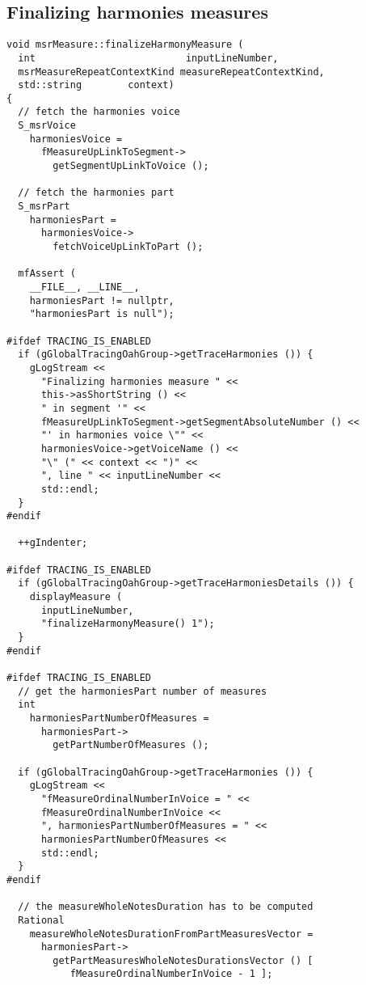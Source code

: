 \subsection{Finalizing harmonies measures}

\begin{lstlisting}[language=CPlusPlus]
void msrMeasure::finalizeHarmonyMeasure (
  int                          inputLineNumber,
  msrMeasureRepeatContextKind measureRepeatContextKind,
  std::string        context)
{
  // fetch the harmonies voice
  S_msrVoice
    harmoniesVoice =
      fMeasureUpLinkToSegment->
        getSegmentUpLinkToVoice ();

  // fetch the harmonies part
  S_msrPart
    harmoniesPart =
      harmoniesVoice->
        fetchVoiceUpLinkToPart ();

  mfAssert (
    __FILE__, __LINE__,
    harmoniesPart != nullptr,
    "harmoniesPart is null");

#ifdef TRACING_IS_ENABLED
  if (gGlobalTracingOahGroup->getTraceHarmonies ()) {
    gLogStream <<
      "Finalizing harmonies measure " <<
      this->asShortString () <<
      " in segment '" <<
      fMeasureUpLinkToSegment->getSegmentAbsoluteNumber () <<
      "' in harmonies voice \"" <<
      harmoniesVoice->getVoiceName () <<
      "\" (" << context << ")" <<
      ", line " << inputLineNumber <<
      std::endl;
  }
#endif

  ++gIndenter;

#ifdef TRACING_IS_ENABLED
  if (gGlobalTracingOahGroup->getTraceHarmoniesDetails ()) {
    displayMeasure (
      inputLineNumber,
      "finalizeHarmonyMeasure() 1");
  }
#endif

#ifdef TRACING_IS_ENABLED
  // get the harmoniesPart number of measures
  int
    harmoniesPartNumberOfMeasures =
      harmoniesPart->
        getPartNumberOfMeasures ();

  if (gGlobalTracingOahGroup->getTraceHarmonies ()) {
    gLogStream <<
      "fMeasureOrdinalNumberInVoice = " <<
      fMeasureOrdinalNumberInVoice <<
      ", harmoniesPartNumberOfMeasures = " <<
      harmoniesPartNumberOfMeasures <<
      std::endl;
  }
#endif

  // the measureWholeNotesDuration has to be computed
  Rational
    measureWholeNotesDurationFromPartMeasuresVector =
      harmoniesPart->
        getPartMeasuresWholeNotesDurationsVector () [
           fMeasureOrdinalNumberInVoice - 1 ];


\end{lstlisting}
